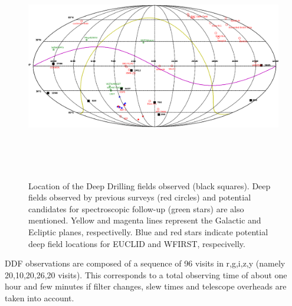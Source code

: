 \documentclass [11pt,a4paper]{article}
\begin{document}
\begin{figure}[htbp]
\begin{center}
\includegraphics[width=14cm,height=10cm]{Figures/All.png}
\caption{Location of the Deep Drilling fields observed (black squares). Deep fields observed by previous surveys (red circles) and potential candidates for spectroscopic follow-up (green stars) are also mentioned. Yellow and magenta lines represent the Galactic and Ecliptic planes, respectivelly. Blue and red stars indicate potential deep field locations for EUCLID and WFIRST, respecivelly.}\label{fig:ddf_map}
\end{center}
\end{figure}

DDF observations are composed of a sequence of 96 visits in r,g,i,z,y (namely 20,10,20,26,20 visits). This corresponds to a total observing time of about one hour and few minutes if filter changes, slew times and telescope overheads are taken into account.
\end{document}
